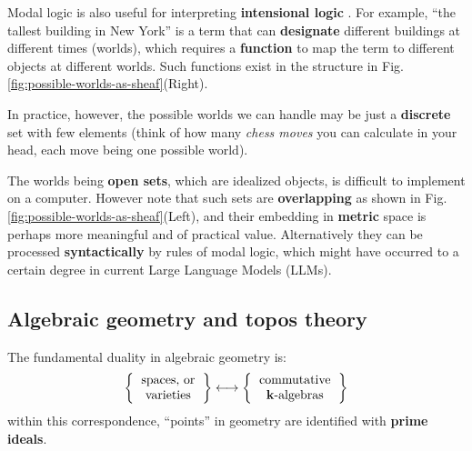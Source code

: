 \documentclass[runningheads]{llncs}
\begin{document}
Modal logic is also useful for interpreting \textbf{intensional logic} \cite{Stanford2022-intension}.  For example, ``the tallest building in New York'' is a term that can \textbf{designate} different buildings at different times (worlds), which requires a \textbf{function} to map the term to different objects at different worlds.  Such functions exist in the structure in Fig.\ref{fig:possible-worlds-as-sheaf}(Right).

In practice, however, the possible worlds we can handle may be just a \textbf{discrete} set with few elements (think of how many \textit{chess moves} you can calculate in your head, each move being one possible world).  %

The worlds being \textbf{open sets}, which are idealized objects, is difficult to implement on a computer.  However note that such sets are \textbf{overlapping} as shown in Fig.\ref{fig:possible-worlds-as-sheaf}(Left), and their embedding in \textbf{metric} space is perhaps more meaningful and of practical value.  Alternatively they can be processed \textbf{syntactically} by rules of modal logic, which might have occurred to a certain degree in current Large Language Models (LLMs).

\subsection{Algebraic geometry and topos theory}

The fundamental duality in algebraic geometry is:
\begin{equation}
\left\{ \begin{tabular}{cc} spaces, or \\ varieties \end{tabular} \right\} \longleftrightarrow \left\{ \begin{tabular}{cc} commutative \\ $\mathbf{k}$-algebras \end{tabular} \right\}
\end{equation}
within this correspondence, ``points'' in geometry are identified with \textbf{prime ideals}.
\end{document}
